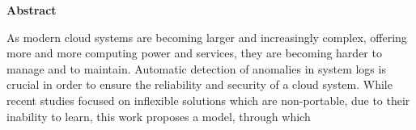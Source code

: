 \thispagestyle{empty}
\vspace*{1.0cm}

\begin{center}
    \textbf{Abstract}
\end{center}

\vspace*{0.5cm}

\noindent
As modern cloud systems are becoming larger and increasingly complex, offering more and more computing power and services, they are becoming harder to manage and to maintain. Automatic detection of anomalies in system logs is crucial in order to ensure the reliability and security of a cloud system. While recent studies focused on inflexible solutions which are non-portable, due to their inability to learn, this work proposes a model, through which 